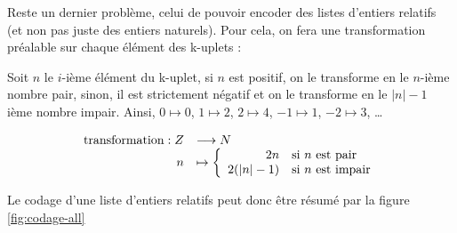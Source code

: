 \documentclass{article}
\begin{document}
Reste un dernier problème, celui de pouvoir encoder des listes d'entiers relatifs (et non pas juste des entiers naturels). Pour cela, on
fera une transformation préalable sur chaque élément des k-uplets :

Soit $n$ le $i$-ième élément du k-uplet, si $n$ est positif, on le transforme en le $n$-ième nombre pair, sinon, il est strictement négatif et on le transforme en le $|n|-1$ ième nombre impair. Ainsi, $0 \mapsto 0$, $1 \mapsto 2$, $2 \mapsto 4$, $-1 \mapsto 1$, $-2 \mapsto 3$, \dots

\begin{equation}
  \begin{array}{r l}
    \mathrm{transformation} : Z & \longrightarrow N \\
    n & \mapsto
    \left \{
      \begin{array}{r l}
        2n       & \text{si $n$ est pair} \\
        2(|n|-1) & \text{si $n$ est impair}
      \end{array}
    \right .
  \end{array}
\end{equation}

Le codage d'une liste d'entiers relatifs peut donc être résumé par la figure \ref{fig:codage-all}
\end{document}

